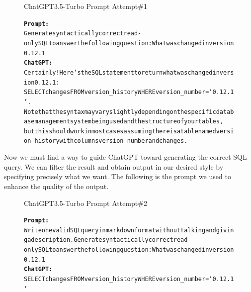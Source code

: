 \begin{figure}[H]
    \begin{AIbox}{ChatGPT3.5-Turbo Prompt Attempt\#1}
        \vspace{-5px}
        \parbox{1\textwidth}{\scriptsize
        \begin{alltt} 
            {\bf Prompt:} \\ 
            Generate syntactically correct read-only SQL to answer the following question: What was changed in version 0.12.1
            \\
            {\bf ChatGPT:} \\
            Certainly! Here's the SQL statement to return what was changed in version 0.12.1:\\
            SELECT changes FROM version\_history WHERE version\_number = '0.12.1'. \\ Note that the syntax may vary slightly depending on the specific database management system being used and the structure of your tables,\\ but this should work in most cases assuming there is a table named version\_history with columns version\_number and changes.
        \end{alltt}
        }
        \vspace{-5px}
    \end{AIbox}
\end{figure}

Now we must find a way to guide ChatGPT toward generating the correct SQL query. We can filter the result and obtain output in our desired style by specifying precisely what we want. The following is the prompt we used to enhance the quality of the output.

\begin{figure}[H]
    \begin{AIbox}{ChatGPT3.5-Turbo Prompt Attempt\#2}
        \vspace{-5px}
        \parbox{1\textwidth}{\scriptsize
        \begin{alltt} 
            {\bf Prompt:} \\ 
            Write one valid SQL query in markdown format without talking and giving a description. Generate syntactically correct read-only SQL to answer the following question: What was changed in version 0.12.1
            \\
            {\bf ChatGPT:} \\
            SELECT changes FROM version\_history WHERE version\_number = '0.12.1'
        \end{alltt}
        }
        \vspace{-5px}
    \end{AIbox}
\end{figure}

